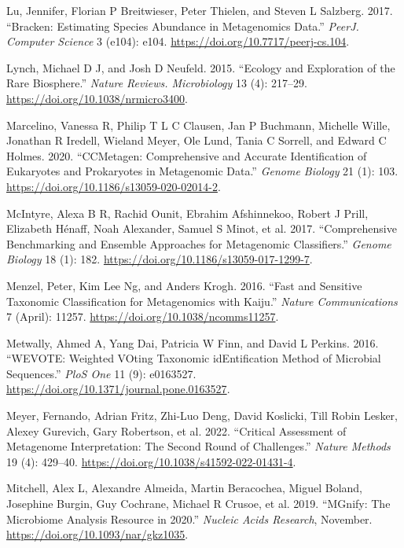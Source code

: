 \documentclass[
]{article}
\newlength{\cslhangindent}
\newlength{\cslentryspacingunit} %
\newenvironment{CSLReferences}[2] %
 {%
  \setlength{\parindent}{0pt}
  \ifodd #1
  \let\oldpar\par
  \def\par{\hangindent=\cslhangindent\oldpar}
  \fi
  \setlength{\parskip}{#2\cslentryspacingunit}
 }%
 {}
\begin{document}
\begin{CSLReferences}{1}{0}
\leavevmode{}%
Lu, Jennifer, Florian P Breitwieser, Peter Thielen, and Steven L
Salzberg. 2017. {``Bracken: Estimating Species Abundance in Metagenomics
Data.''} \emph{PeerJ. Computer Science} 3 (e104): e104.
\url{https://doi.org/10.7717/peerj-cs.104}.

\leavevmode{}%
Lynch, Michael D J, and Josh D Neufeld. 2015. {``Ecology and Exploration
of the Rare Biosphere.''} \emph{Nature Reviews. Microbiology} 13 (4):
217--29. \url{https://doi.org/10.1038/nrmicro3400}.

\leavevmode{}%
Marcelino, Vanessa R, Philip T L C Clausen, Jan P Buchmann, Michelle
Wille, Jonathan R Iredell, Wieland Meyer, Ole Lund, Tania C Sorrell, and
Edward C Holmes. 2020. {``{CCMetagen}: Comprehensive and Accurate
Identification of Eukaryotes and Prokaryotes in Metagenomic Data.''}
\emph{Genome Biology} 21 (1): 103.
\url{https://doi.org/10.1186/s13059-020-02014-2}.

\leavevmode{}%
McIntyre, Alexa B R, Rachid Ounit, Ebrahim Afshinnekoo, Robert J Prill,
Elizabeth Hénaff, Noah Alexander, Samuel S Minot, et al. 2017.
{``Comprehensive Benchmarking and Ensemble Approaches for Metagenomic
Classifiers.''} \emph{Genome Biology} 18 (1): 182.
\url{https://doi.org/10.1186/s13059-017-1299-7}.

\leavevmode{}%
Menzel, Peter, Kim Lee Ng, and Anders Krogh. 2016. {``Fast and Sensitive
Taxonomic Classification for Metagenomics with Kaiju.''} \emph{Nature
Communications} 7 (April): 11257.
\url{https://doi.org/10.1038/ncomms11257}.

\leavevmode{}%
Metwally, Ahmed A, Yang Dai, Patricia W Finn, and David L Perkins. 2016.
{``{WEVOTE}: Weighted {VOting} Taxonomic {idEntification} Method of
Microbial Sequences.''} \emph{PloS One} 11 (9): e0163527.
\url{https://doi.org/10.1371/journal.pone.0163527}.

\leavevmode{}%
Meyer, Fernando, Adrian Fritz, Zhi-Luo Deng, David Koslicki, Till Robin
Lesker, Alexey Gurevich, Gary Robertson, et al. 2022. {``Critical
Assessment of Metagenome Interpretation: The Second Round of
Challenges.''} \emph{Nature Methods} 19 (4): 429--40.
\url{https://doi.org/10.1038/s41592-022-01431-4}.

\leavevmode{}%
Mitchell, Alex L, Alexandre Almeida, Martin Beracochea, Miguel Boland,
Josephine Burgin, Guy Cochrane, Michael R Crusoe, et al. 2019.
{``{MGnify}: The Microbiome Analysis Resource in 2020.''} \emph{Nucleic
Acids Research}, November. \url{https://doi.org/10.1093/nar/gkz1035}.


\end{CSLReferences}
\end{document}
